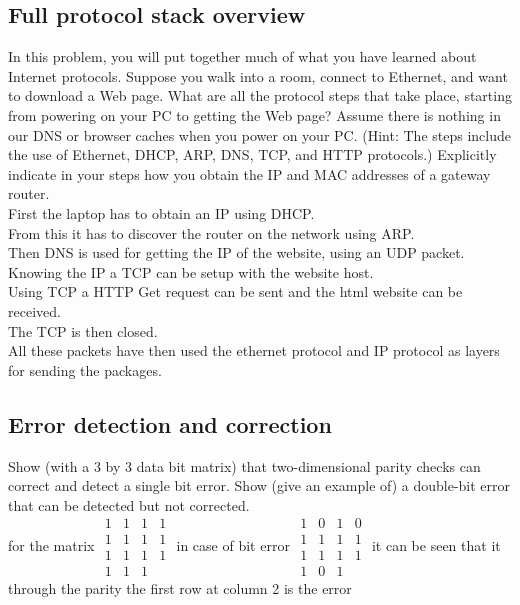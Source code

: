 \documentclass[12pt, a4paper]{article}
\begin{document}
		\subsection{Full protocol stack overview}
			In this problem, you will put together much of what you have learned about Internet protocols. Suppose you walk into a room, connect to Ethernet, and want to download a Web page. What are all the protocol steps that take place, starting from powering on your PC to getting the Web page? Assume there is nothing in our DNS or browser caches when you power on your PC. (Hint: The steps include the use of Ethernet, DHCP, ARP, DNS, TCP, and HTTP protocols.) Explicitly indicate in your steps how you obtain the IP and MAC addresses of a gateway router.\\
			First the laptop has to obtain an IP using DHCP.\\
			From this it has to discover the router on the network using ARP.\\
			Then DNS is used for getting the IP of the website, using an UDP packet.\\
			Knowing the IP a TCP can be setup with the website host.\\
			Using TCP a HTTP Get request can be sent and the html website can be received.\\
			The TCP is then closed.\\
			All these packets have then used the ethernet protocol and IP protocol as layers for sending the packages.
		\subsection{Error detection and correction}
			Show (with a 3 by 3 data bit matrix) that two-dimensional parity checks can correct and detect a single bit error. Show (give an example of) a double-bit error that can be detected but not corrected.\\
			for the matrix
			$\begin{array}{ccc|c}
				1&1&1& 1\\
				1&1&1&1\\
				1&1&1&1\\
				\hline
				1&1&1&
				\end{array}$ in case of bit error $\begin{array}{ccc|c}
				1&0&1& 0\\
				1&1&1&1\\
				1&1&1&1\\
				\hline
				1&0&1&
				\end{array}$ it can be seen that it through the parity the first row at column 2 is the error
\end{document}
